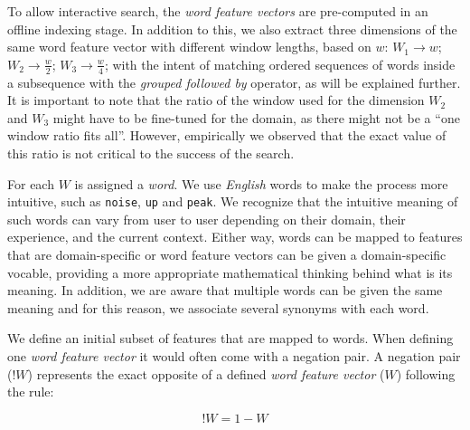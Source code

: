 To allow interactive search, the \textit{word feature vectors} are pre-computed in an offline indexing stage. In addition to this, we also extract three dimensions of the same word feature vector with different window lengths, based on $w$: $W_1 \rightarrow w$; $W_2 \rightarrow \frac{w}{2}$; $W_3 \rightarrow \frac{w}{4}$; with the intent of matching ordered sequences of words inside a subsequence with the \textit{grouped followed by} operator, as will be explained further. It is important to note that the ratio of the window used for the dimension $W_2$ and $W_3$ might have to be fine-tuned for the domain, as there might not be a “one window ratio fits all”. However, empirically we observed that the exact value of this ratio is not critical to the success of the search.

For each $W$ is assigned a \textit{word}. We use \textit{English} words to make the process more intuitive, such as \texttt{noise}, \texttt{up} and \texttt{peak}. We recognize that the intuitive meaning of such words can vary from user to user depending on their domain, their experience, and the current context. Either way, words can be mapped to features that are domain-specific or word feature vectors can be given a domain-specific vocable, providing a more appropriate mathematical thinking behind what is its meaning. In addition, we are aware that multiple words can be given the same meaning and for this reason, we associate several synonyms with each word.
\par
We define an initial subset of features that are mapped to words. When defining one \textit{word feature vector} it would often come with a negation pair. A negation pair ($!W$) represents the exact opposite of a defined \textit{word feature vector} ($W$) following the rule:

\begin{equation}
\label{eq:neg_pair}
!W = 1-W
\end{equation}

